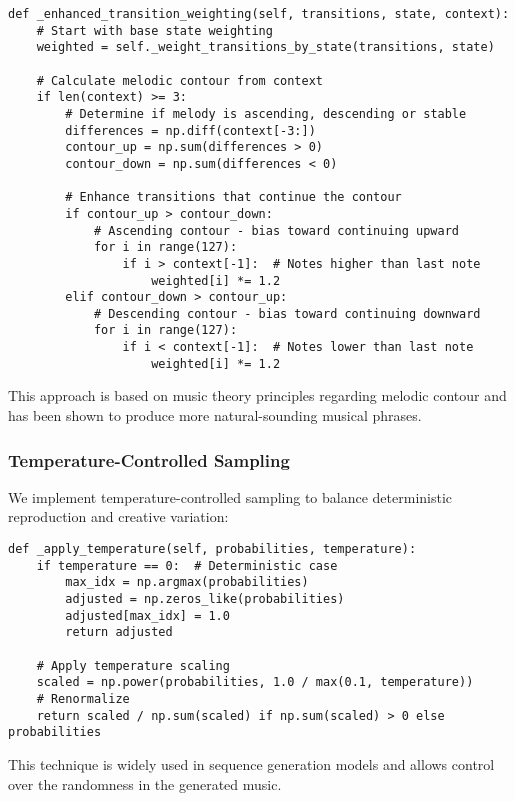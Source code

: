 \documentclass[12pt,a4paper]{article}
\begin{document}
\begin{verbatim}
def _enhanced_transition_weighting(self, transitions, state, context):
    # Start with base state weighting
    weighted = self._weight_transitions_by_state(transitions, state)
    
    # Calculate melodic contour from context
    if len(context) >= 3:
        # Determine if melody is ascending, descending or stable
        differences = np.diff(context[-3:])
        contour_up = np.sum(differences > 0)
        contour_down = np.sum(differences < 0)
        
        # Enhance transitions that continue the contour
        if contour_up > contour_down:
            # Ascending contour - bias toward continuing upward
            for i in range(127):
                if i > context[-1]:  # Notes higher than last note
                    weighted[i] *= 1.2
        elif contour_down > contour_up:
            # Descending contour - bias toward continuing downward
            for i in range(127):
                if i < context[-1]:  # Notes lower than last note
                    weighted[i] *= 1.2
\end{verbatim}

This approach is based on music theory principles regarding melodic contour \cite{huron2006sweet} and has been shown to produce more natural-sounding musical phrases.

\subsubsection{Temperature-Controlled Sampling}

We implement temperature-controlled sampling to balance deterministic reproduction and creative variation:

\begin{verbatim}
def _apply_temperature(self, probabilities, temperature):
    if temperature == 0:  # Deterministic case
        max_idx = np.argmax(probabilities)
        adjusted = np.zeros_like(probabilities)
        adjusted[max_idx] = 1.0
        return adjusted
        
    # Apply temperature scaling
    scaled = np.power(probabilities, 1.0 / max(0.1, temperature))
    # Renormalize
    return scaled / np.sum(scaled) if np.sum(scaled) > 0 else probabilities
\end{verbatim}

This technique is widely used in sequence generation models \cite{holtzman2019curious} and allows control over the randomness in the generated music.
\end{document}
